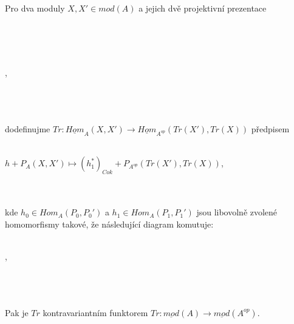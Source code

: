      \begin{thm}
       Pro dva moduly $X,X'\in mod(A)$ a jejich dvě projektivní prezentace 
       \\\\      
       \centerline{}\\\\       
       \centerline{,}\\\\\\
       dodefinujme $Tr:\underline{Hom}_A(X,X')\rightarrow 
       \underline{Hom}_{A^{op}}(Tr(X'),Tr(X))$ předpisem \\\\
       \centerline{$h+P_A(X,X')\mapsto (h_1^*)_{Cok}+P_{A^{op}}(Tr(X'),Tr(X))$,}
       \\\\kde $h_0\in Hom_A(P_0,P_0')$ a $h_1\in Hom_A(P_1,P_1')$ jsou 
       libovolně zvolené homomorfismy takové, že následující diagram komutuje: 
       \\\\
           \centerline{,}\\\\\\     
       Pak je $Tr$ kontravariantním funktorem $Tr: \underline{mod}(A)\rightarrow 
       \underline{mod}(A^{op})$. 
     \end{thm}
